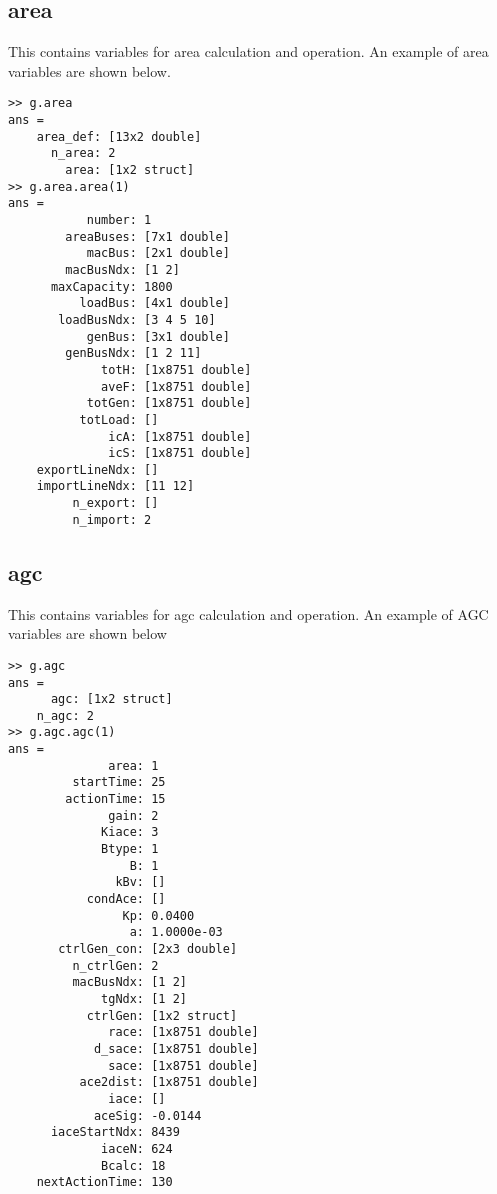\subsection{area}  
This contains variables for area calculation and operation.
An example of area variables are shown below.
\begin{verbatim}
>> g.area
ans = 
    area_def: [13x2 double]
      n_area: 2
        area: [1x2 struct]
>> g.area.area(1)
ans = 
           number: 1
        areaBuses: [7x1 double]
           macBus: [2x1 double]
        macBusNdx: [1 2]
      maxCapacity: 1800
          loadBus: [4x1 double]
       loadBusNdx: [3 4 5 10]
           genBus: [3x1 double]
        genBusNdx: [1 2 11]
             totH: [1x8751 double]
             aveF: [1x8751 double]
           totGen: [1x8751 double]
          totLoad: []
              icA: [1x8751 double]
              icS: [1x8751 double]
    exportLineNdx: []
    importLineNdx: [11 12]
         n_export: []
         n_import: 2
\end{verbatim}


\pagebreak
\subsection{agc}  
This contains variables for agc calculation and operation.
An example of AGC variables are shown below

\begin{verbatim}
>> g.agc
ans = 
      agc: [1x2 struct]
    n_agc: 2
>> g.agc.agc(1)
ans = 
              area: 1
         startTime: 25
        actionTime: 15
              gain: 2
             Kiace: 3
             Btype: 1
                 B: 1
               kBv: []
           condAce: []
                Kp: 0.0400
                 a: 1.0000e-03
       ctrlGen_con: [2x3 double]
         n_ctrlGen: 2
         macBusNdx: [1 2]
             tgNdx: [1 2]
           ctrlGen: [1x2 struct]
              race: [1x8751 double]
            d_sace: [1x8751 double]
              sace: [1x8751 double]
          ace2dist: [1x8751 double]
              iace: []
            aceSig: -0.0144
      iaceStartNdx: 8439
             iaceN: 624
             Bcalc: 18
    nextActionTime: 130
\end{verbatim}

\pagebreak

